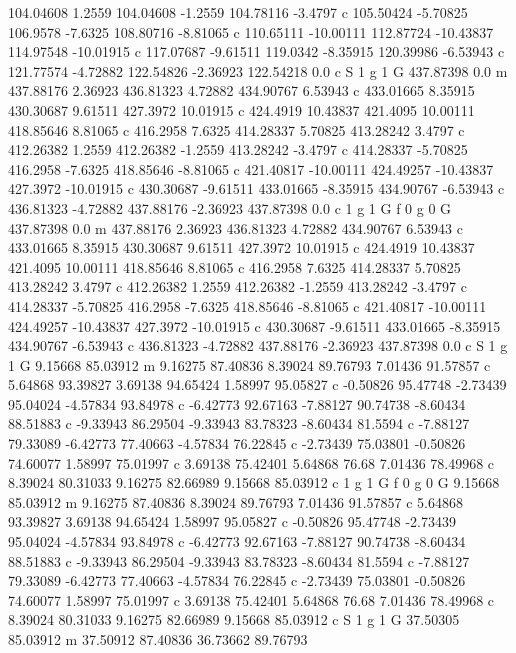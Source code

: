 104.04608 1.2559 
104.04608 -1.2559 
104.78116 -3.4797 c 
105.50424 -5.70825 
106.9578 -7.6325 
108.80716 -8.81065 c 
110.65111 -10.00111 
112.87724 -10.43837 
114.97548 -10.01915 c 
117.07687 -9.61511 
119.0342 -8.35915 
120.39986 -6.53943 c 
121.77574 -4.72882 
122.54826 -2.36923 
122.54218 0.0 c 
S 
1 g 1 G 
437.87398 0.0 m 
437.88176 2.36923 
436.81323 4.72882 
434.90767 6.53943 c 
433.01665 8.35915 
430.30687 9.61511 
427.3972 10.01915 c 
424.4919 10.43837 
421.4095 10.00111 
418.85646 8.81065 c 
416.2958 7.6325 
414.28337 5.70825 
413.28242 3.4797 c 
412.26382 1.2559 
412.26382 -1.2559 
413.28242 -3.4797 c 
414.28337 -5.70825 
416.2958 -7.6325 
418.85646 -8.81065 c 
421.40817 -10.00111 
424.49257 -10.43837 
427.3972 -10.01915 c 
430.30687 -9.61511 
433.01665 -8.35915 
434.90767 -6.53943 c 
436.81323 -4.72882 
437.88176 -2.36923 
437.87398 0.0 c 
1 g 1 G f 
0 g 0 G 
437.87398 0.0 m 
437.88176 2.36923 
436.81323 4.72882 
434.90767 6.53943 c 
433.01665 8.35915 
430.30687 9.61511 
427.3972 10.01915 c 
424.4919 10.43837 
421.4095 10.00111 
418.85646 8.81065 c 
416.2958 7.6325 
414.28337 5.70825 
413.28242 3.4797 c 
412.26382 1.2559 
412.26382 -1.2559 
413.28242 -3.4797 c 
414.28337 -5.70825 
416.2958 -7.6325 
418.85646 -8.81065 c 
421.40817 -10.00111 
424.49257 -10.43837 
427.3972 -10.01915 c 
430.30687 -9.61511 
433.01665 -8.35915 
434.90767 -6.53943 c 
436.81323 -4.72882 
437.88176 -2.36923 
437.87398 0.0 c 
S 
1 g 1 G 
9.15668 85.03912 m 
9.16275 87.40836 
8.39024 89.76793 
7.01436 91.57857 c 
5.64868 93.39827 
3.69138 94.65424 
1.58997 95.05827 c 
-0.50826 95.47748 
-2.73439 95.04024 
-4.57834 93.84978 c 
-6.42773 92.67163 
-7.88127 90.74738 
-8.60434 88.51883 c 
-9.33943 86.29504 
-9.33943 83.78323 
-8.60434 81.5594 c 
-7.88127 79.33089 
-6.42773 77.40663 
-4.57834 76.22845 c 
-2.73439 75.03801 
-0.50826 74.60077 
1.58997 75.01997 c 
3.69138 75.42401 
5.64868 76.68 
7.01436 78.49968 c 
8.39024 80.31033 
9.16275 82.66989 
9.15668 85.03912 c 
1 g 1 G f 
0 g 0 G 
9.15668 85.03912 m 
9.16275 87.40836 
8.39024 89.76793 
7.01436 91.57857 c 
5.64868 93.39827 
3.69138 94.65424 
1.58997 95.05827 c 
-0.50826 95.47748 
-2.73439 95.04024 
-4.57834 93.84978 c 
-6.42773 92.67163 
-7.88127 90.74738 
-8.60434 88.51883 c 
-9.33943 86.29504 
-9.33943 83.78323 
-8.60434 81.5594 c 
-7.88127 79.33089 
-6.42773 77.40663 
-4.57834 76.22845 c 
-2.73439 75.03801 
-0.50826 74.60077 
1.58997 75.01997 c 
3.69138 75.42401 
5.64868 76.68 
7.01436 78.49968 c 
8.39024 80.31033 
9.16275 82.66989 
9.15668 85.03912 c 
S 
1 g 1 G 
37.50305 85.03912 m 
37.50912 87.40836 
36.73662 89.76793 
